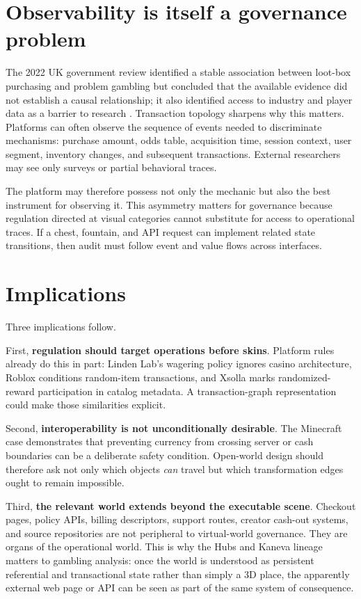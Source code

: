 \documentclass[11pt]{article}
\begin{document}
\section{Observability is itself a governance problem}
The 2022 UK government review identified a stable association between loot-box purchasing and problem gambling but concluded that the available evidence did not establish a causal relationship; it also identified access to industry and player data as a barrier to research \parencite{dcms2022lootboxevidence}. Transaction topology sharpens why this matters. Platforms can often observe the sequence of events needed to discriminate mechanisms: purchase amount, odds table, acquisition time, session context, user segment, inventory changes, and subsequent transactions. External researchers may see only surveys or partial behavioral traces.

The platform may therefore possess not only the mechanic but also the best instrument for observing it. This asymmetry matters for governance because regulation directed at visual categories cannot substitute for access to operational traces. If a chest, fountain, and API request can implement related state transitions, then audit must follow event and value flows across interfaces.

\section{Implications}
Three implications follow.

First, \textbf{regulation should target operations before skins}. Platform rules already do this in part: Linden Lab's wagering policy ignores casino architecture, Roblox conditions random-item transactions, and Xsolla marks randomized-reward participation in catalog metadata. A transaction-graph representation could make those similarities explicit.

Second, \textbf{interoperability is not unconditionally desirable}. The Minecraft case demonstrates that preventing currency from crossing server or cash boundaries can be a deliberate safety condition. Open-world design should therefore ask not only which objects \emph{can} travel but which transformation edges ought to remain impossible.

Third, \textbf{the relevant world extends beyond the executable scene}. Checkout pages, policy APIs, billing descriptors, support routes, creator cash-out systems, and source repositories are not peripheral to virtual-world governance. They are organs of the operational world. This is why the Hubs and Kaneva lineage matters to gambling analysis: once the world is understood as persistent referential and transactional state rather than simply a 3D place, the apparently external web page or API can be seen as part of the same system of consequence.
\end{document}
